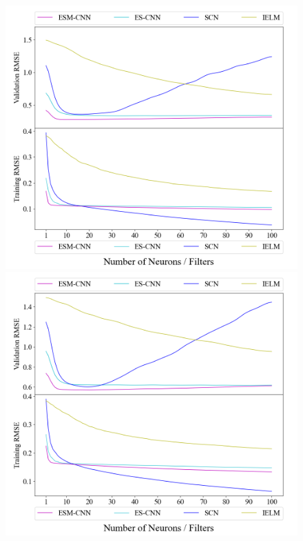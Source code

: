 \begin{figure}[!t]
    \centering
    \begin{minipage}[b]{0.43\textwidth}
        \includegraphics[width = \textwidth]{float/ch.cnn/sili_H1_revise.png}
    \end{minipage}
    \hspace{4em}
    \begin{minipage}[b]{0.43\textwidth}
        \includegraphics[width = \textwidth]{float/ch.cnn/sili_H4_revise.png}

\end{minipage}
\end{figure}
